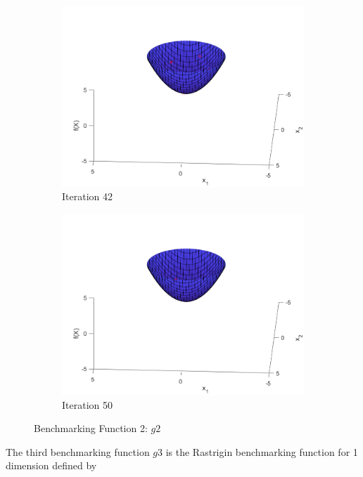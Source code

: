 \begin{figure}
\begin{subfigure}[b]{0.4\textwidth}
    \includegraphics[width=\textwidth]{img/smpl/sphr/loa-iter-42}
    \caption{Iteration 42}
    \label{fig:s2-iter-6}
  \end{subfigure}
  \begin{subfigure}[b]{0.4\textwidth}
    \includegraphics[width=\textwidth]{img/smpl/sphr/loa-iter-50}
    \caption{Iteration 50}
    \label{fig:s2-iter-7}
  \end{subfigure}
  \caption{Benchmarking Function 2: $g2$}
\end{figure}


\par The third benchmarking function $g3$ is the Rastrigin benchmarking function for 1 dimension defined by

